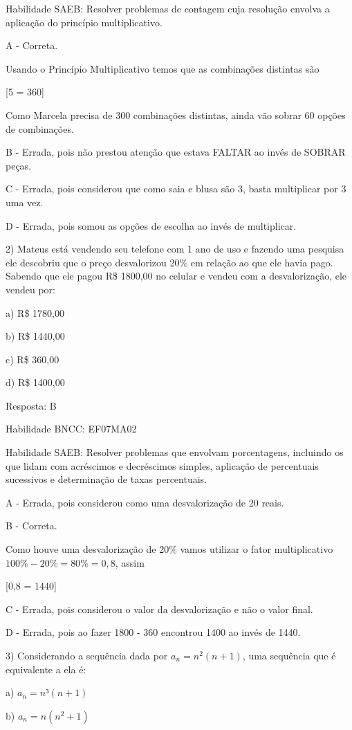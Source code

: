 Habilidade SAEB: Resolver problemas de contagem cuja resolução envolva a
aplicação do princípio multiplicativo.

A - Correta.

Usando o Princípio Multiplicativo temos que as combinações distintas são

[5     = 360]

Como Marcela precisa de 300 combinações distintas, ainda vão sobrar 60
opções de combinações.

B - Errada, pois não prestou atenção que estava FALTAR ao invés de
SOBRAR peças.

C - Errada, pois considerou que como saia e blusa são 3, basta
multiplicar por 3 uma vez.

D - Errada, pois somou as opções de escolha ao invés de multiplicar.

2) Mateus está vendendo seu telefone com 1 ano de uso e fazendo uma
pesquisa ele descobriu que o preço desvalorizou 20\% em relação ao que
ele havia pago. Sabendo que ele pagou R\$ 1800,00 no celular e vendeu
com a desvalorização, ele vendeu por:

a) R\$ 1780,00

b) R\$ 1440,00

c) R\$ 360,00

d) R\$ 1400,00

Resposta: B

Habilidade BNCC: EF07MA02

Habilidade SAEB: Resolver problemas que envolvam porcentagens, incluindo
os que lidam com acréscimos e decréscimos simples, aplicação de
percentuais sucessivos e determinação de taxas percentuais.

A - Errada, pois considerou como uma desvalorização de 20 reais.

B - Correta.

Como houve uma desvalorização de 20\% vamos utilizar o fator
multiplicativo \(100\% - 20\% = 80\% = 0,8\), assim

[0,8  = 1440]

C - Errada, pois considerou o valor da desvalorização e não o valor
final.

D - Errada, pois ao fazer 1800 - 360 encontrou 1400 ao invés de 1440.

3) Considerando a sequência dada por \(a_{n} = n^2(n + 1)\), uma
sequência que é equivalente a ela é:

a) \(a_{n} = n³(n + 1)\)

b) \(a_{n} = n(n^2 + 1)\)

